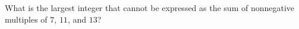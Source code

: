 What is the largest integer that cannot be expressed as the sum of nonnegative multiples of $7$, $11$, and $13$?
